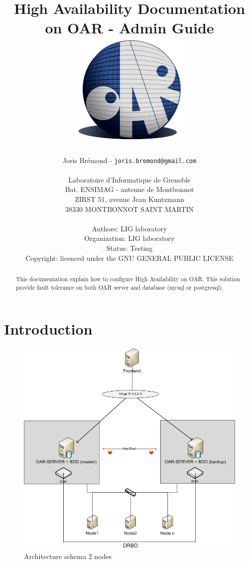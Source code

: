 \documentclass[a4paper,10pt]{report}
\title{High Availability Documentation on OAR - Admin Guide\\
\includegraphics[scale=0.7]{schema/oar_logo_detoure.png}}
\author{Joris Brémond - \texttt{joris.bremond@gmail.com}\\
\\
Laboratoire d'Informatique de Grenoble\\
Bat. ENSIMAG - antenne de Montbonnot\\
ZIRST 51, avenue Jean Kuntzmann\\
38330 MONTBONNOT SAINT MARTIN\\
\\
Authors: LIG laboratory\\
Organization: LIG laboratory\\
Status: Testing\\
Copyright: licenced under the GNU GENERAL PUBLIC LICENSE\\
}
\begin{document}
\maketitle
\tableofcontents

\begin{abstract}
This documentation explain how to configure High Availability on OAR. This solution provide fault tolerance on both OAR server and database (mysql or postgresql).
\end{abstract}












  
\chapter{Introduction}
\begin{figure}
\includegraphics[scale=0.5]{schema/architecture-schema-2-node.png}
\caption{Architecture schema 2 nodes} 
\label{2nodesschema} 
\end{figure} 
\end{document}
